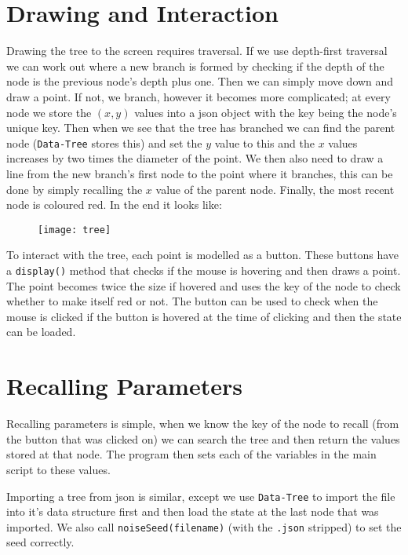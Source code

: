 \section{Drawing and Interaction}
Drawing the tree to the screen requires traversal. If we use depth-first
traversal we can work out where a new branch is formed by checking if the depth
of the node is the previous node's depth plus one. Then we can simply move down
and draw a point. If not, we branch, however it becomes more complicated; at
every node we store the $(x,y)$ values into a json object with the key being the
node's unique key. Then when we see that the tree has branched we can find the
parent node (\verb|Data-Tree| stores this) and set the $y$ value to this and the
$x$ values increases by two times the diameter of the point. We then also need
to draw a line from the new branch's first node to the point where it branches,
this can be done by simply recalling the $x$ value of the parent node. Finally,
the most recent node is coloured red. In the end it looks like:

\begin{figure}[H]
    \centering
    \texttt{[image: tree]}
    \caption{}
\end{figure}

To interact with the tree, each point is modelled as a button. These buttons
have a \verb|display()| method that checks if the mouse is hovering and then
draws a point. The point becomes twice the size if hovered and uses the key of
the node to check whether to make itself red or not. The button can be used to
check when the mouse is clicked if the button is hovered at the time of clicking
and then the state can be loaded.

\section{Recalling Parameters}
Recalling parameters is simple, when we know the key of the node to recall (from
the button that was clicked on) we can search the tree and then return the
values stored at that node. The program then sets each of the variables in the
main script to these values.

Importing a tree from json is similar, except we use \verb|Data-Tree| to import
the file into it's data structure first and then load the state at the last node
that was imported. We also call \verb|noiseSeed(filename)| (with the
\verb|.json| stripped) to set the seed correctly.

